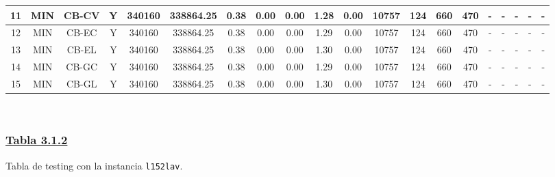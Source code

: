 {\begin{tabular}{ *{19}{c|} c }
\hline
11 & MIN & CB-CV & Y & 340160 & 338864.25 & 0.38 & 0.00 & 0.00 & 1.28 & 0.00 & 10757 & 124 & 660 & 470 & - & - & - & - & -\\
\hline
12 & MIN & CB-EC & Y & 340160 & 338864.25 & 0.38 & 0.00 & 0.00 & 1.29 & 0.00 & 10757 & 124 & 660 & 470 & - & - & - & - & -\\
\hline
13 & MIN & CB-EL & Y & 340160 & 338864.25 & 0.38 & 0.00 & 0.00 & 1.30 & 0.00 & 10757 & 124 & 660 & 470 & - & - & - & - & -\\
\hline
14 & MIN & CB-GC & Y & 340160 & 338864.25 & 0.38 & 0.00 & 0.00 & 1.29 & 0.00 & 10757 & 124 & 660 & 470 & - & - & - & - & -\\
\hline
15 & MIN & CB-GL & Y & 340160 & 338864.25 & 0.38 & 0.00 & 0.00 & 1.30 & 0.00 & 10757 & 124 & 660 & 470 & - & - & - & - & -\\
\hline
\end{tabular}\\
\vspace{4mm}
}

\subsubsection*{\underline{Tabla 3.1.2}}
\noindent Tabla de testing con la instancia \verb_l152lav_.\\

